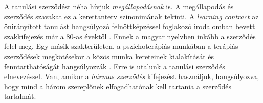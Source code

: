 A tanulási szerződést néha hívjuk \emph{megállapodásnak} is. A megállapodás és
szerződés szavakat ez a kerettanterv szinonimának tekinti. A \emph{learn\-ing
      con\-tract} az önirányított tanulást hangsúlyozó felnőttképzéssel
foglakozó
irodalomban
bevett szakkifejezés már a 80-as évektől \citep{Malcolm77}. Ennek a magyar
nyelvben inkább a szerződés felel meg. Egy másik szakterületen, a
pszichoterápiás munkában a terápiás szerződések megkötésekor a közös munka
kereteinek kialakítását és fenntarthatóságát hangsúlyozzák
\citep{pszichoterapia}. Erre is utalunk a tanulási szerződés elnevezéssel. Van,
amikor a \emph{hármas szerződés} kifejezést használjuk, hangsúlyozva, hogy mind
a három szereplőnek elfogadhatónak kell tartania a szerződés tartalmát.
